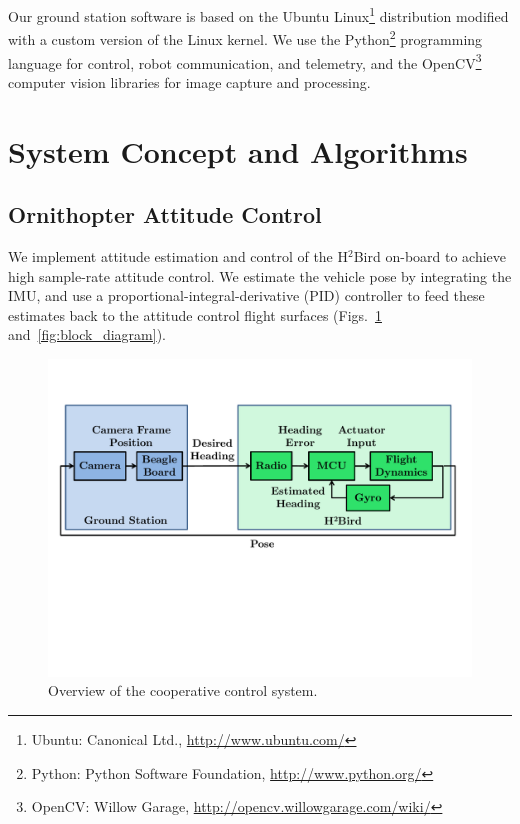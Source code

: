 \documentclass{aamas2013}
\begin{document}
Our ground station software is based on the Ubuntu Linux\footnote{\raggedright Ubuntu: 
Canonical Ltd., \href{http://www.ubuntu.com/}{http://www.ubuntu.com/}} distribution
modified with a custom version of the Linux kernel. 
We use the Python\footnote{\raggedright Python: Python Software Foundation, \href{http://www.python.org/}
{http://www.python.org/}} programming language for control, robot 
communication, and telemetry, and the OpenCV\footnote{\raggedright OpenCV: Willow Garage, 
\href{http://opencv.willowgarage.com/wiki/}{http://opencv.willowgarage.com/wiki/}} 
computer vision libraries for image capture and processing.

\section{System Concept and Algorithms}

\subsection{Ornithopter Attitude Control}

We implement attitude estimation and control of the H$^2$Bird on-board to 
achieve high sample-rate attitude control. We estimate the vehicle pose by
integrating the IMU, and use a proportional-integral-derivative (PID) 
controller to feed these estimates back to the attitude control flight 
surfaces (Figs.~\ref{fig:process_flow} and~\ref{fig:block_diagram}).

\begin{figure}[tb]
\centering
\includegraphics[width=\linewidth]{figures/process_flow.pdf}
\caption{Overview of the cooperative control system.}
\label{fig:process_flow}
\end{figure}
\end{document}
